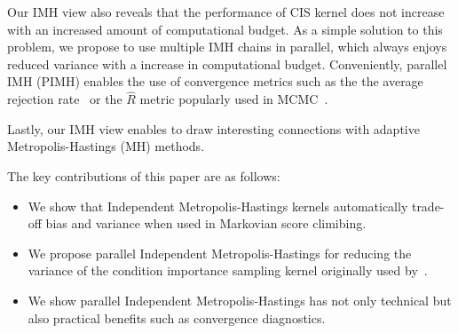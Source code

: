 Our IMH view also reveals that the performance of CIS kernel does not increase with an increased amount of computational budget.
As a simple solution to this problem, we propose to use multiple IMH chains in parallel, which always enjoys reduced variance with a increase in computational budget.
Conveniently, parallel IMH (PIMH) enables the use of convergence metrics such as the the average rejection rate~\citep{neklyudov_metropolishastings_2019} or the \(\widehat{R}\) metric popularly used in MCMC~\cite{gelman_inference_2011, vehtari_ranknormalization_2020}.

Lastly, our IMH view enables to draw interesting connections with adaptive Metropolis-Hastings (MH) methods.

The key contributions of this paper are as follows:
\begin{itemize}
  \item We show that Independent Metropolis-Hastings kernels automatically trade-off bias and variance when used in Markovian score climibing.
  \item We propose parallel Independent Metropolis-Hastings for reducing the variance of the condition importance sampling kernel originally used by~\citet{NEURIPS2020_b2070693}.
  \item We show parallel Independent Metropolis-Hastings has not only technical but also practical benefits such as convergence diagnostics.
\end{itemize}


